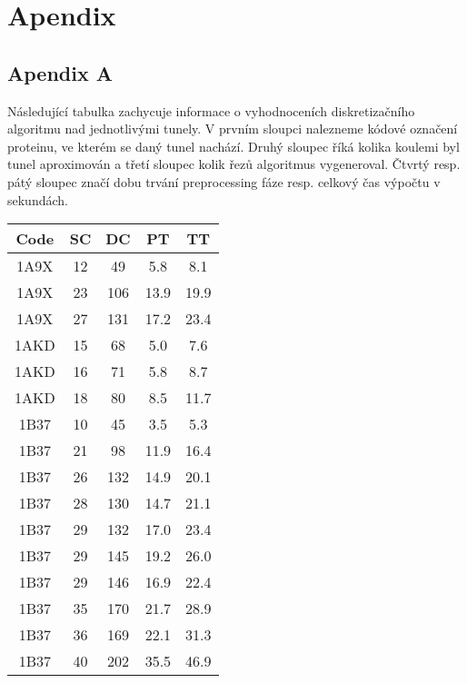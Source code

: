 \chapter*{Apendix}

\section*{Apendix A}
Následující tabulka zachycuje informace o vyhodnoceních diskretizačního
algoritmu nad jednotlivými tunely. V prvním sloupci nalezneme kódové označení
proteinu, ve kterém se daný tunel nachází. Druhý sloupec říká kolika koulemi byl
tunel aproximován a třetí sloupec kolik řezů algoritmus vygeneroval. Čtvrtý
resp. pátý sloupec značí dobu trvání preprocessing fáze resp. celkový čas výpočtu
v sekundách.
\begin{table}[htbp]
    \fontsize{9}{11}\selectfont
    \begin{tabular}{||c | c c c c||}
        \hline
        Code & SC & DC & PT & TT \\ [0.5ex]
        \hline\hline
        1A9X & 12 & 49 & 5.8 & 8.1 \\
        \hline
        1A9X & 23 & 106 & 13.9 & 19.9 \\
        \hline
        1A9X & 27 & 131 & 17.2 & 23.4 \\
        \hline
        1AKD & 15 & 68 & 5.0 & 7.6 \\
        \hline
        1AKD & 16 & 71 & 5.8 & 8.7 \\
        \hline
        1AKD & 18 & 80 & 8.5 & 11.7 \\
        \hline
        1B37 & 10 & 45 & 3.5 & 5.3 \\
        \hline
        1B37 & 21 & 98 & 11.9 & 16.4 \\
        \hline
        1B37 & 26 & 132 & 14.9 & 20.1 \\
        \hline
        1B37 & 28 & 130 & 14.7 & 21.1 \\
        \hline
        1B37 & 29 & 132 & 17.0 & 23.4 \\
        \hline
        1B37 & 29 & 145 & 19.2 & 26.0 \\
        \hline
        1B37 & 29 & 146 & 16.9 & 22.4 \\
        \hline
        1B37 & 35 & 170 & 21.7 & 28.9 \\
        \hline
        1B37 & 36 & 169 & 22.1 & 31.3 \\
        \hline
        1B37 & 40 & 202 & 35.5 & 46.9 \\

\end{tabular}
\end{table}
